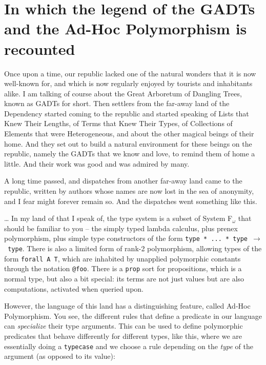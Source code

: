 \section{In which the legend of the GADTs and the Ad-Hoc Polymorphism is
recounted}\label{in-which-the-legend-of-the-gadts-and-the-ad-hoc-polymorphism-is-recounted}

\identNormal\it

Once upon a time, our republic lacked one of the natural wonders that it
is now well-known for, and which is now regularly enjoyed by tourists
and inhabitants alike. I am talking of course about the Great Arboretum
of Dangling Trees, known as GADTs for short. Then settlers from the
far-away land of the Dependency started coming to the republic and
started speaking of Lists that Knew Their Lengths, of Terms that Knew
Their Types, of Collections of Elements that were Heterogeneous, and
about the other magical beings of their home. And they set out to build
a natural environment for these beings on the republic, namely the GADTs
that we know and love, to remind them of home a little. And their work
was good and was admired by many.

A long time passed, and dispatches from another far-away land came to
the republic, written by authors whose names are now lost in the sea of
anonymity, and I fear might forever remain so. And the dispatches went
something like this.

\rm

\heroAUTHOR{} \ldots{} In my land of \lamprolog that I speak of, the type
system is a subset of System F\(_\omega\) that should be familiar to you
-- the simply typed lambda calculus, plus prenex polymorphism, plus
simple type constructors of the form
\texttt{type\ *\ ...\ *\ type\ \ensuremath{\to}\ type}. There is also a
limited form of rank-2 polymorphism, allowing types of the form
\texttt{forall\ A\ T}, which are inhabited by unapplied polymorphic
constants through the notation \texttt{@foo}. There is a \texttt{prop}
sort for propositions, which is a normal type, but also a bit special:
its terms are not just values but are also computations, activated when
queried upon.

However, the language of this land has a distinguishing feature, called
Ad-Hoc Polymorphism. You see, the different rules that define a
predicate in our language can \emph{specialize} their type arguments.
This can be used to define polymorphic predicates that behave
differently for different types, like this, where we are essentially
doing a \texttt{typecase} and we choose a rule depending on the
\emph{type} of the argument (as opposed to its value):

